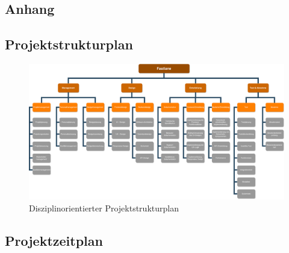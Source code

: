 


\begin{landscape}
    \section{Anhang}
    \label{sec:anhang}

    \subsection{Projektstrukturplan}
    \label{subsec:anhang_projektstrukturplan}

    \begin{figure}[H]
        \centering
        \includegraphics[width = 1.4\textwidth]{pictures/Projektstrukturplan}
        \caption{Disziplinorientierter Projektstrukturplan}
        \label{fig:anwendungsfalldiagramm_2}
    \end{figure}

    \subsection{Projektzeitplan}
    \label{subsec:anhang_projektzeitplan}

    \begin{uml}[H]
        \centering
        
        \caption{Zeitplan}
        \label{uml:zeitplan}
    \end{uml}
\end{landscape}